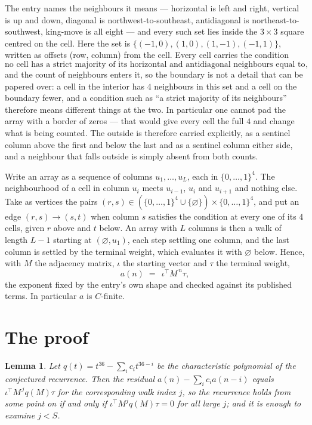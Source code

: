 \documentclass[11pt,a4paper]{article}
\theoremstyle{plain}
\newtheorem{lemma}[theorem]{Lemma}
\theoremstyle{definition}
\begin{document}
The entry names the neighbours it means --- horizontal is left and right, vertical is up and
down, diagonal is northwest-to-southeast, antidiagonal is northeast-to-southwest, king-move is
all eight --- and every such set lies inside the $3\times3$ square centred on the cell. Here
the set is $\{(-1,0), (1,0), (1,-1), (-1,1)\}$, written as offsets (row, column) from the cell. Every cell carries
the condition
\[
\text{no cell has a strict majority of its horizontal and antidiagonal neighbours equal to 1},
\]
and the count of neighbours enters it, so the boundary is not a detail that can be papered
over: a cell in the interior has $4$ neighbours in this set and a cell on the boundary
fewer, and a condition such as ``a strict majority of its neighbours'' therefore means
different things at the two. In particular one cannot pad the array with a border of zeros ---
that would give every cell the full $4$ and change what is being counted. The outside is
therefore carried
explicitly, as a sentinel column above the first and below the last and as a sentinel column
either side, and a neighbour that falls outside is simply absent from both counts.

Write an array as a sequence of columns $u_1,\dots,u_L$, each in
$\{0,\dots,1\}^{4}$. The neighbourhood of a cell in column $u_i$ meets $u_{i-1}$,
$u_i$ and $u_{i+1}$ and nothing else. Take as vertices the pairs
$(r,s)\in(\{0,\dots,1\}^{4}\cup\{\varnothing\})\times\{0,\dots,1\}^{4}$,
and put an edge $(r,s)\to(s,t)$ when column $s$ satisfies the condition at every one of its
$4$ cells, given $r$ above and $t$ below. An array with $L$ columns is then a walk of length
$L-1$ starting at $(\varnothing,u_1)$, each step settling one column, and the last column is
settled by the terminal weight, which evaluates it with $\varnothing$ below. Hence,
with $M$ the adjacency matrix, $\iota$ the starting vector and $\tau$ the terminal weight,
\[
a(n)\;=\;\,\iota^{\!\top}M^{\,n}\tau ,
\]
the exponent fixed by the entry's own shape and checked against its published terms. In
particular $a$ is $C$-finite.

\section{The proof}

\begin{lemma}\label{lem:crit}
Let $q(t)=t^{36}-\sum_i c_it^{36-i}$ be the characteristic polynomial of the
conjectured recurrence. Then the residual $a(n)-\sum_ic_ia(n-i)$ equals
$\iota^{\!\top}M^{\,j}q(M)\tau$ for the corresponding walk index $j$, so the
recurrence holds from some point on if and only if $\iota^{\!\top}M^{j}q(M)\tau=0$ for all
large $j$; and it is enough to examine $j<S$.
\end{lemma}
\end{document}
